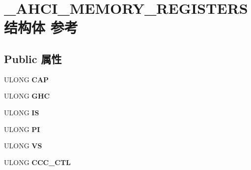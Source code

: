 \hypertarget{struct___a_h_c_i___m_e_m_o_r_y___r_e_g_i_s_t_e_r_s}{}\section{\+\_\+\+A\+H\+C\+I\+\_\+\+M\+E\+M\+O\+R\+Y\+\_\+\+R\+E\+G\+I\+S\+T\+E\+R\+S结构体 参考}
\label{struct___a_h_c_i___m_e_m_o_r_y___r_e_g_i_s_t_e_r_s}
\subsection*{Public 属性}
\begin{DoxyCompactItemize}
\item 
\mbox{\label{struct___a_h_c_i___m_e_m_o_r_y___r_e_g_i_s_t_e_r_s_a4a6b4ccfa4c353f14232320044a4cf06}} 
U\+L\+O\+NG {\bfseries C\+AP}
\item 
\mbox{\label{struct___a_h_c_i___m_e_m_o_r_y___r_e_g_i_s_t_e_r_s_ac567f92f33b7a088515898f1a96cadb4}} 
U\+L\+O\+NG {\bfseries G\+HC}
\item 
\mbox{\label{struct___a_h_c_i___m_e_m_o_r_y___r_e_g_i_s_t_e_r_s_a429a62bc9d155b26fcdf9b75b9922180}} 
U\+L\+O\+NG {\bfseries IS}
\item 
\mbox{\label{struct___a_h_c_i___m_e_m_o_r_y___r_e_g_i_s_t_e_r_s_a1a56d3a8784db5f8915b907cdcd82971}} 
U\+L\+O\+NG {\bfseries PI}
\item 
\mbox{\label{struct___a_h_c_i___m_e_m_o_r_y___r_e_g_i_s_t_e_r_s_adb58aaab58cb68d5a31ca12b6b90002d}} 
U\+L\+O\+NG {\bfseries VS}
\item 
\mbox{\label{struct___a_h_c_i___m_e_m_o_r_y___r_e_g_i_s_t_e_r_s_a0bb9e6845e641565c1d95350136469d4}} 
U\+L\+O\+NG {\bfseries C\+C\+C\+\_\+\+C\+TL}
\item 
\mbox{\label{struct___a_h_c_i___m_e_m_o_r_y___r_e_g_i_s_t_e_r_s_ab2471e4e0a7773d71c2472092cc4ab47}} 

\end{DoxyCompactItemize}
